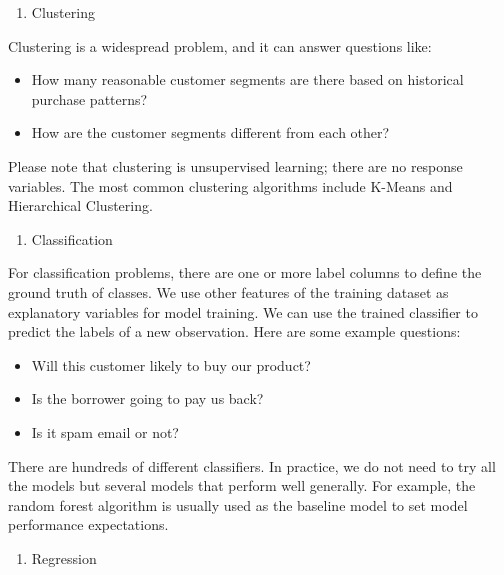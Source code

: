 \documentclass[12pt,]{krantz}
\providecommand{\tightlist}{%
  \setlength{\itemsep}{0pt}\setlength{\parskip}{0pt}}
\begin{document}
\begin{enumerate}
\def\labelenumi{\arabic{enumi}.}
\setcounter{enumi}{2}
\tightlist
\item
  Clustering
\end{enumerate}

Clustering is a widespread problem, and it can answer questions like:

\begin{itemize}
\tightlist
\item
  How many reasonable customer segments are there based on historical purchase patterns?
\item
  How are the customer segments different from each other?
\end{itemize}

Please note that clustering is unsupervised learning; there are no response variables. The most common clustering algorithms include K-Means and Hierarchical Clustering.

\begin{enumerate}
\def\labelenumi{\arabic{enumi}.}
\setcounter{enumi}{3}
\tightlist
\item
  Classification
\end{enumerate}

For classification problems, there are one or more label columns to define the ground truth of classes. We use other features of the training dataset as explanatory variables for model training. We can use the trained classifier to predict the labels of a new observation. Here are some example questions:

\begin{itemize}
\tightlist
\item
  Will this customer likely to buy our product?
\item
  Is the borrower going to pay us back?
\item
  Is it spam email or not?
\end{itemize}

There are hundreds of different classifiers. In practice, we do not need to try all the models but several models that perform well generally. For example, the random forest algorithm is usually used as the baseline model to set model performance expectations.

\begin{enumerate}
\def\labelenumi{\arabic{enumi}.}
\setcounter{enumi}{4}
\tightlist
\item
  Regression
\end{enumerate}
\end{document}
